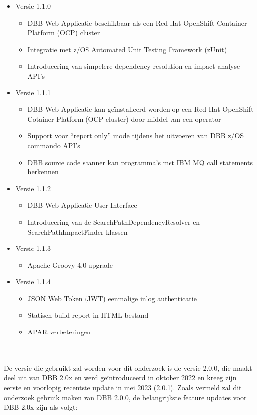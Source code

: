 \begin{itemize}
    \item Versie 1.1.0
    \begin{itemize}
        \item DBB Web Applicatie beschikbaar als een Red Hat OpenShift Container Platform (OCP) cluster
        \item Integratie met z/OS Automated Unit Testing Framework (zUnit)
        \item Introducering van simpelere dependency resolution en impact analyse API's
    \end{itemize}
    \item Versie 1.1.1
    \begin{itemize}
        \item DBB Web Applicatie kan geïnstalleerd worden op een Red Hat OpenShift Cotainer Platform (OCP cluster) door middel van een operator
        \item Support voor ``report only'' mode tijdens het uitvoeren van DBB z/OS commando API's
        \item DBB source code scanner kan programma's met IBM MQ call statements herkennen
    \end{itemize}
    \item Versie 1.1.2
    \begin{itemize}
        \item DBB Web Applicatie User Interface
        \item Introducering van de SearchPathDependencyResolver en SearchPathImpactFinder klassen
    \end{itemize}
    \item Versie 1.1.3
    \begin{itemize}
        \item Apache Groovy 4.0 upgrade
    \end{itemize}
    \item Versie 1.1.4
    \begin{itemize}
        \item JSON Web Token (JWT) eenmalige inlog authenticatie
        \item Statisch build report in HTML bestand
        \item APAR verbeteringen
    \end{itemize}
\end{itemize}
\autocite{IBM2023}
\\ \\
De versie die gebruikt zal worden voor dit onderzoek is de versie 2.0.0, die maakt deel uit van DBB 2.0x en werd geïntroduceerd in oktober 2022 en kreeg zijn eerste en voorlopig recentste update in mei 2023 (2.0.1). Zoals vermeld zal dit onderzoek gebruik maken van DBB 2.0.0, de belangrijkste feature updates voor DBB 2.0x zijn als volgt:
